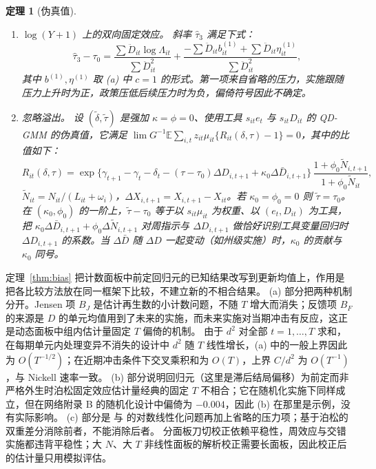 \documentclass[11pt,a4paper]{ctexart}
\newtheorem{theorem}{定理}
\theoremstyle{definition}
\newcommand{\E}{\mathbb{E}}
\begin{document}
\begin{theorem}[伪真值]
\begin{enumerate}[leftmargin=2em,label=(\alph*)]
\item \emph{$\log(Y+1)$ 上的双向固定效应。} 斜率 $\hat\tau_3$ 满足下式：
\[
\hat\tau_3-\tau_0=\frac{\sum\ddot D_{it}\log\Lambda_{it}}{\sum\ddot D_{it}^2}+\frac{-\sum\ddot D_{it}b^{(1)}_{it}+\sum\ddot D_{it}\eta^{(1)}_{it}}{\sum\ddot D_{it}^2},
\]
其中 $b^{(1)},\eta^{(1)}$ 取 (a) 中 $c=1$ 的形式。第一项来自省略的压力，实施跟随压力上升时为正，政策压低后续压力时为负，偏倚符号因此不确定。
\item \emph{忽略溢出。} 设 $(\tilde\delta,\tilde\tau)$ 是强加 $\kappa=\phi=0$、使用工具 $s_{it}e_t$ 与 $s_{it}D_{it}$ 的 QD-GMM 的伪真值，它满足 $\lim G^{-1}\E\sum_{i,t}z_{it}\mu_{it}\{R_{it}(\delta,\tau)-1\}=0$，其中的比值如下：
\[
R_{it}(\delta,\tau)=\exp\{\gamma_{t+1}-\gamma_t-\delta_t-(\tau-\tau_0)\Delta D_{i,t+1}+\kappa_0\Delta\bar D_{i,t+1}\}\,\frac{1+\phi_0\tilde N_{i,t+1}}{1+\phi_0\tilde N_{it}},
\]
$\tilde N_{it}=N_{it}/(L_{it}+\omega_i)$，$\Delta X_{i,t+1}=X_{i,t+1}-X_{it}$。若 $\kappa_0=\phi_0=0$ 则 $\tilde\tau=\tau_0$。
在 $(\kappa_0,\phi_0)$ 的一阶上，$\tilde\tau-\tau_0$ 等于以 $s_{it}\mu_{it}$ 为权重、以 $(e_t,D_{it})$ 为工具，把 $\kappa_0\Delta\bar D_{i,t+1}+\phi_0\Delta\tilde N_{i,t+1}$ 对周指示与 $\Delta D_{i,t+1}$ 做恰好识别工具变量回归时 $\Delta D_{i,t+1}$ 的系数。当 $\Delta\bar D$ 随 $\Delta D$ 一起变动（如州级实施）时，$\kappa_0$ 的贡献与 $\kappa_0$ 同号。
\end{enumerate}
\end{theorem}

定理~\ref{thm:bias} 把计数面板中前定回归元的已知结果改写到更新均值上，作用是把各比较方法放在同一框架下比较，不建立新的不相合结果。
(a) 部分把两种机制分开。Jensen 项 $B_J$ 是估计再生数的小计数问题，不随 $T$ 增大而消失；反馈项 $B_F$ 的来源是 $D$ 的单元均值用到了未来的实施，而未来实施对当期冲击有反应，这正是动态面板中组内估计量固定 $T$ 偏倚的机制\citep{nickell1981biases}。
由于 $d^2$ 对全部 $t=1,\dots,T$ 求和，在每期单元内处理变异不消失的设计中 $d^2$ 随 $T$ 线性增长，(a) 中的一般上界因此为 $O(T^{-1/2})$；在近期冲击条件下交叉乘积和为 $O(T)$，上界 $C/d^2$ 为 $O(T^{-1})$，与 Nickell 速率一致。
(b) 部分说明回归元（这里是滞后结局偏移）为前定而非严格外生时泊松固定效应估计量经典的固定 $T$ 不相合\citep{hausman1984count,wooldridge1997multiplicative,wooldridge1999distribution,blundell2002count}；它在随机化实施下同样成立，但在网络附录 B 的随机化设计中偏倚为 $-0.004$，因此 (b) 在那里是示例，没有实际影响。
(c) 部分是\citet{santossilva2006log} 与\citet{chen2024logs} 的对数线性化问题再加上省略的压力项；基于泊松的双重差分\citep{wooldridge2023nonlinear}消除前者，不能消除后者。
分面板刀切校正\citep{dhaene2015splitpanel}依赖平稳性，周效应与交错实施都违背平稳性；大 $N$、大 $T$ 非线性面板的解析校正\citep{fernandezval2016individual}需要长面板，因此校正后的估计量只用模拟评估。
\end{document}
